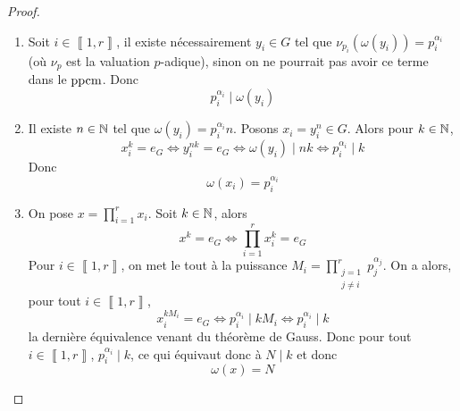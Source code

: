 \documentclass[12pt]{article}
\begin{document}
\begin{proof}
	\phantom{}
	\begin{enumerate}
		\item Soit $i\in\left\llbracket 1,r\right\rrbracket$, il existe nécessairement $y_{i}\in G$ tel que $\nu_{p_{i}}(\omega(y_{i}))=p_{i}^{\alpha_{i}}$ (où $\nu_{p}$ est la valuation $p$-adique), sinon on ne pourrait pas avoir ce terme dans le $\operatorname{ppcm}$. Donc 
		\begin{equation}
			\boxed{p_{i}^{\alpha_{i}}\mid \omega(y_{i})}
		\end{equation}
		
		\item Il existe $n\in\mathbb{N}$ tel que $\omega(y_{i})=p_{i}^{\alpha_{i}}n$. Posons $x_{i}=y_{i}^{n}\in G$. Alors pour $k\in\mathbb{N}$,
		\begin{equation}
			x_{i}^{k}=e_{G}\Longleftrightarrow y_{i}^{nk}=e_{G}\Longleftrightarrow \omega(y_{i})\mid nk\Longleftrightarrow p_{i}^{\alpha_{i}}\mid k
		\end{equation}
		Donc 
		\begin{equation}
			\boxed{\omega(x_{i})=p_{i}^{\alpha_{i}}}
		\end{equation}

		\item On pose $x=\prod_{i=1}^{r}x_{i}$. Soit $k\in\mathbb{N}$, alors 
		\begin{equation}
			x^{k}=e_{G}\Longleftrightarrow \prod_{i=1}^{r}x_{i}^{k}=e_{G}
		\end{equation}
		Pour $i\in\left\llbracket 1,r\right\rrbracket$, on met le tout à la puissance $M_{i}=\prod_{\substack{j=1\\j\neq i}}^{r}p_{j}^{\alpha_{j}}$. On a alors, pour tout $i\in\left\llbracket 1,r\right\rrbracket$,
		\begin{equation}
			x_{i}^{kM_{i}}=e_{G}\Longleftrightarrow p_{i}^{\alpha_{i}}\mid kM_{i}\Longleftrightarrow p_{i}^{\alpha_{i}}\mid k
		\end{equation}
		la dernière équivalence venant du théorème de Gauss. Donc pour tout $i\in\left\llbracket 1,r\right\rrbracket$, $p_{i}^{\alpha_{i}}\mid k$, ce qui équivaut donc à $N\mid k$ et donc 
		\begin{equation}
			\boxed{\omega(x)=N}
		\end{equation}
	\end{enumerate}
\end{proof}
\end{document}
